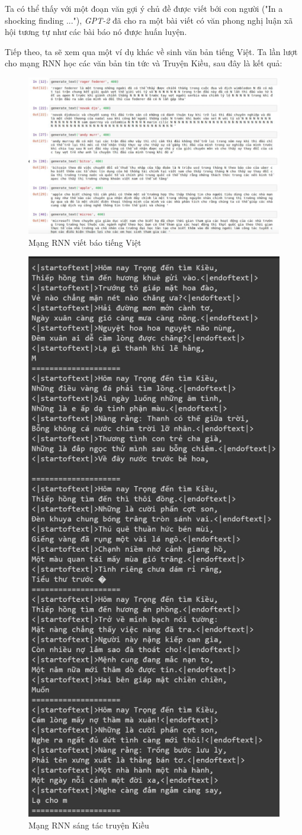 Ta có thể thấy với một đoạn văn gợi ý chủ đề được viết bới con người ("In a shocking finding ..."), \textit{GPT-2} đã cho ra một bài viết có văn phong nghị luận xã hội tương tự như các bài báo nó được huấn luyện.

Tiếp theo, ta sẽ xem qua một ví dụ khác về sinh văn bản tiếng Việt. Ta lần lượt cho mạng RNN học các văn bản tin tức và Truyện Kiều, sau đây là kết quả:

\clearpage
\begin{figure}[h!]
	\centering
		\includegraphics[width=1\columnwidth]{books/artificial-neural-network/chapter07/figure-sec3/vnm-news.png}
		\centering
	\caption{Mạng RNN viết báo tiếng Việt}
\end{figure}
\clearpage
\begin{figure}[h!]
	\centering
		\includegraphics[width=0.64\columnwidth]{books/artificial-neural-network/chapter07/figure-sec3/kieu.jpg}
		\centering
	\caption{Mạng RNN sáng tác truyện Kiều}
\end{figure}
